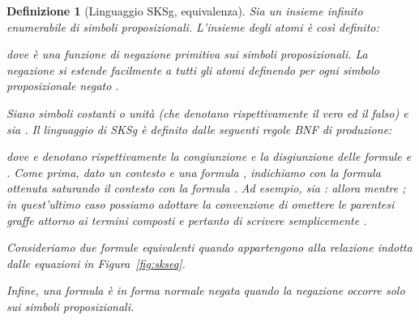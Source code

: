 \documentclass[12pt,a4paper,openright,twoside]{report}
\newtheorem{dfn}[thm]{Definizione}
\begin{document}
\begin{dfn}[Linguaggio \textsf{SKSg}, equivalenza] Sia  un insieme infinito enumerabile di \emph{simboli proposizionali}. L'insieme degli \emph{atomi}  \`e cos\`i definito:

dove  \`e una \emph{funzione di negazione primitiva sui simboli proposizionali}. La negazione si estende facilmente a tutti gli atomi definendo  per ogni simbolo proposizionale negato .

Siano  simboli costanti o \emph{unit\`a} (che denotano rispettivamente \emph{il vero} ed \emph{il falso}) e sia . Il \emph{linguaggio di \textsf{SKSg}} \`e definito dalle seguenti regole BNF di produzione:

dove  e  denotano rispettivamente la \emph{congiunzione} e la \emph{disgiunzione} delle formule  e . Come prima, dato un contesto  e una formula , indichiamo con  la formula ottenuta saturando il contesto  con la formula . Ad esempio, sia : allora  mentre ; in quest'ultimo caso possiamo adottare la convenzione di \emph{omettere le parentesi graffe attorno ai termini composti} e pertanto di scrivere semplicemente .

Consideriamo due formule equivalenti quando appartengono alla relazione indotta dalle equazioni in Figura~\ref{fig:skseq}.

Infine, una formula \`e in \emph{forma normale negata} quando la negazione occorre solo sui simboli proposizionali.
\end{dfn}
\end{document}
